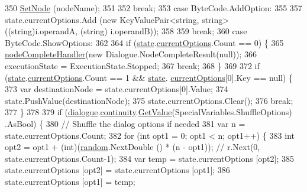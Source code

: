 \begin{DoxyCode}
350                 \hyperlink{a00156_a6364593ea1115d65e34b343422cfbbbd}{SetNode} (nodeName);
351 
352                 \textcolor{keywordflow}{break};
353             \textcolor{keywordflow}{case} ByteCode.AddOption:
355 
357                 state.currentOptions.Add (\textcolor{keyword}{new} KeyValuePair<string, string> ((string)i.operandA, (\textcolor{keywordtype}{string})
      i.operandB));
358 
359                 \textcolor{keywordflow}{break};
360             \textcolor{keywordflow}{case} ByteCode.ShowOptions:
362 
364                 \textcolor{keywordflow}{if} (\hyperlink{a00156_a70f2ce6201cdd2430ceaa764ac614ca0}{state}.\hyperlink{a00159_ab816dfea32ecda23282700f01454e0a9}{currentOptions}.Count == 0) \{
365                     \hyperlink{a00156_a5129c63e67e2d4e2780d86b8351320a2}{nodeCompleteHandler}(\textcolor{keyword}{new} Dialogue.NodeCompleteResult(null));
366                     executionState = ExecutionState.Stopped;
367                     \textcolor{keywordflow}{break};
368                 \}
369 
372                 \textcolor{keywordflow}{if} (\hyperlink{a00156_a70f2ce6201cdd2430ceaa764ac614ca0}{state}.\hyperlink{a00159_ab816dfea32ecda23282700f01454e0a9}{currentOptions}.Count == 1 && \hyperlink{a00156_a70f2ce6201cdd2430ceaa764ac614ca0}{state}.
      \hyperlink{a00159_ab816dfea32ecda23282700f01454e0a9}{currentOptions}[0].Key == null) \{
373                     var destinationNode = state.currentOptions[0].Value;
374                     state.PushValue(destinationNode);
375                     state.currentOptions.Clear();
376                     \textcolor{keywordflow}{break};
377                 \}
378 
379                 \textcolor{keywordflow}{if} (\hyperlink{a00156_ac506426c503da5f033247c29e11c5e82}{dialogue}.\hyperlink{a00086_ae94eaa4b03b432422f5d205fabe37ff5}{continuity}.\hyperlink{a00184_accab1fc5c8fc353dbfc53ca0f4029576}{GetValue}(SpecialVariables.ShuffleOptions)
      .AsBool) \{
380                     \textcolor{comment}{// Shuffle the dialog options if needed}
381                     var n = state.currentOptions.Count;
382                     \textcolor{keywordflow}{for} (\textcolor{keywordtype}{int} opt1 = 0; opt1 < n; opt1++) \{
383                         \textcolor{keywordtype}{int} opt2 = opt1 + (int)(\hyperlink{a00156_a408485a00c7cc558428c86ed9dd04fca}{random}.NextDouble () * (n - opt1)); \textcolor{comment}{// r.Next(0,
       state.currentOptions.Count-1);}
384                         var temp = state.currentOptions [opt2];
385                         state.currentOptions [opt2] = state.currentOptions [opt1];
386                         state.currentOptions [opt1] = temp;

\end{DoxyCode}
